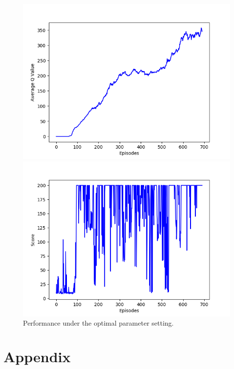 \documentclass{article}
\begin{document}
\begin{figure}[H]
  \centering
  \begin{minipage}{0.49\textwidth}
    \centering
    \includegraphics[scale=0.45]{../experiments/final/qvalues.png}
  \end{minipage}
  \begin{minipage}{0.49\textwidth}
    \centering
    \includegraphics[scale=0.45]{../experiments/final/scores.png}
  \end{minipage}
  \caption{Performance under the optimal parameter setting.}
  \label{final}
\end{figure}

\pagebreak
\appendix
\section{Appendix}

\end{document}

